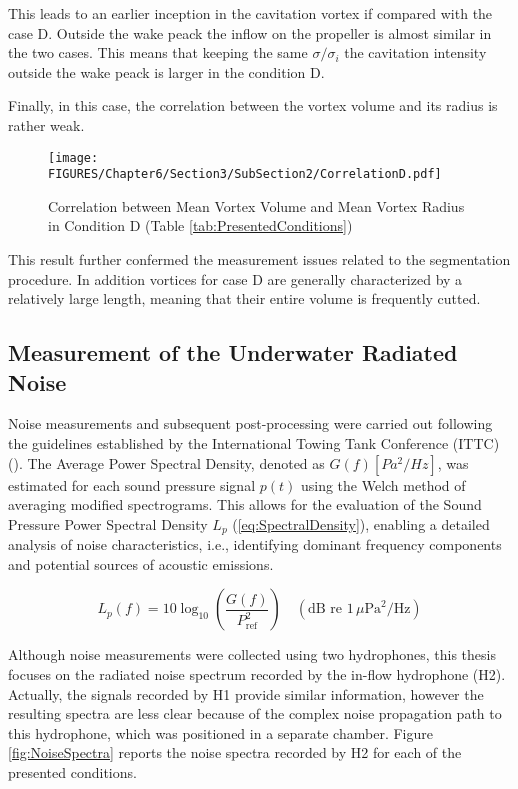 \begin{itemize}
    This leads to an earlier inception in the cavitation vortex if compared with the case D. Outside the wake peack the inflow on the propeller is almost similar in the two cases. 
    This means that keeping the same $\sigma/\sigma_i$ the cavitation intensity outside the wake peack is larger in the condition D.

    Finally, in this case, the correlation between the vortex volume and its radius is rather weak.

    \begin{figure}[h] 
        \centering
        \texttt{[image: FIGURES/Chapter6/Section3/SubSection2/CorrelationD.pdf]}
        \caption{Correlation between Mean Vortex Volume and Mean Vortex Radius in Condition D (Table \ref{tab:PresentedConditions})}
        \label{fig:CorrelationD}
    \end{figure}

    This result further confermed the measurement issues related to the segmentation procedure.
    In addition vortices for case D are generally characterized by a relatively large length, meaning that their entire volume is frequently cutted. 

\end{itemize}

\subsection{Measurement of the Underwater Radiated Noise}
\label{sez:NoiseRes}

Noise measurements and subsequent post-processing were carried out following the guidelines established by the International Towing Tank Conference (ITTC) (\cite{ITTC_Noise}). 
The Average Power Spectral Density, denoted as $G(f) [Pa^2/Hz]$, was estimated for each sound pressure signal $p(t)$ using the Welch method of averaging modified spectrograms. 
This allows for the evaluation of the Sound Pressure Power Spectral Density $L_p$ (\ref{eq:SpectralDensity}), enabling a detailed analysis of noise characteristics, i.e., identifying dominant frequency components and potential sources of acoustic emissions.

\begin{equation}
    L_p(f) = 10 \log_{10} \left( \frac{G(f)}{P_{\text{ref}}^2} \right) \quad (\text{dB re } 1 \, \mu \text{Pa}^2/\text{Hz})
    \label{eq:SpectralDensity}
\end{equation}

Although noise measurements were collected using two hydrophones, this thesis focuses on the radiated noise spectrum recorded by the in-flow hydrophone (H2). 
Actually, the signals recorded by H1 provide similar information, however the resulting spectra are less clear because of the complex noise propagation path to this hydrophone, which was positioned in a separate chamber. Figure \ref{fig:NoiseSpectra} reports the noise spectra recorded by H2 for each of the presented conditions.

